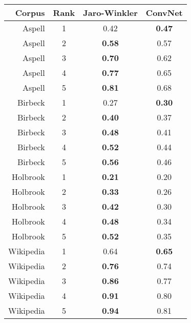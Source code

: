 \begin{tabular}{rccc}
  \hline
Corpus & Rank & Jaro-Winkler & ConvNet \\ 
  \hline
Aspell &   1 & 0.42 & \textbf{0.47} \\ 
Aspell &   2 & \textbf{0.58} & 0.57 \\ 
Aspell &   3 & \textbf{0.70} & 0.62 \\ 
Aspell &   4 & \textbf{0.77} & 0.65 \\ 
Aspell &   5 & \textbf{0.81} & 0.68 \\ 
\hline
Birbeck &   1 & 0.27 & \textbf{0.30} \\ 
Birbeck &   2 & \textbf{0.40} & 0.37 \\ 
Birbeck &   3 & \textbf{0.48} & 0.41 \\ 
Birbeck &   4 & \textbf{0.52} & 0.44 \\ 
Birbeck &   5 & \textbf{0.56} & 0.46 \\ 
\hline
Holbrook &   1 & \textbf{0.21} & 0.20 \\ 
Holbrook &   2 & \textbf{0.33} & 0.26 \\ 
Holbrook &   3 & \textbf{0.42} & 0.30 \\ 
Holbrook &   4 & \textbf{0.48} & 0.34 \\ 
Holbrook &   5 & \textbf{0.52} & 0.35 \\ 
\hline
Wikipedia &   1 & 0.64 & \textbf{0.65} \\ 
Wikipedia &   2 & \textbf{0.76} & 0.74 \\ 
Wikipedia &   3 & \textbf{0.86} & 0.77 \\ 
Wikipedia &   4 & \textbf{0.91} & 0.80 \\ 
Wikipedia &   5 & \textbf{0.94} & 0.81 \\ 
   \hline
\end{tabular}